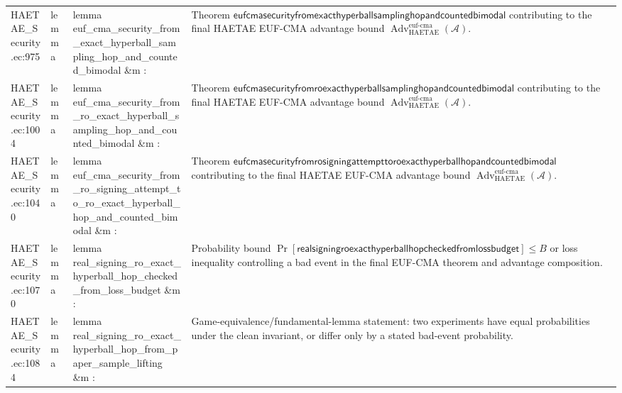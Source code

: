 \documentclass[10pt]{article}
\newcommand{\Adv}{\operatorname{Adv}}
\begin{document}
\begin{longtable}{L{0.11\textwidth}L{0.055\textwidth}L{0.385\textwidth}L{0.41\textwidth}}
HAETAE\_\allowbreak{}Security.\allowbreak{}ec:\allowbreak{}975 & lemma & {\ttfamily\scriptsize lemma euf\_\allowbreak{}cma\_\allowbreak{}security\_\allowbreak{}from\_\allowbreak{}exact\_\allowbreak{}hyperball\_\allowbreak{}sampling\_\allowbreak{}hop\_\allowbreak{}and\_\allowbreak{}counted\_\allowbreak{}bimodal \&m :} & Theorem $\mathsf{eufcmasecurityfromexacthyperballsamplinghopandcountedbimodal}$ contributing to the final HAETAE EUF-CMA advantage bound $\Adv_{\mathrm{HAETAE}}^{\mathrm{euf\mbox{-}cma}}(\mathcal A)$. \\
HAETAE\_\allowbreak{}Security.\allowbreak{}ec:\allowbreak{}1004 & lemma & {\ttfamily\scriptsize lemma euf\_\allowbreak{}cma\_\allowbreak{}security\_\allowbreak{}from\_\allowbreak{}ro\_\allowbreak{}exact\_\allowbreak{}hyperball\_\allowbreak{}sampling\_\allowbreak{}hop\_\allowbreak{}and\_\allowbreak{}counted\_\allowbreak{}bimodal \&m :} & Theorem $\mathsf{eufcmasecurityfromroexacthyperballsamplinghopandcountedbimodal}$ contributing to the final HAETAE EUF-CMA advantage bound $\Adv_{\mathrm{HAETAE}}^{\mathrm{euf\mbox{-}cma}}(\mathcal A)$. \\
HAETAE\_\allowbreak{}Security.\allowbreak{}ec:\allowbreak{}1040 & lemma & {\ttfamily\scriptsize lemma euf\_\allowbreak{}cma\_\allowbreak{}security\_\allowbreak{}from\_\allowbreak{}ro\_\allowbreak{}signing\_\allowbreak{}attempt\_\allowbreak{}to\_\allowbreak{}ro\_\allowbreak{}exact\_\allowbreak{}hyperball\_\allowbreak{}hop\_\allowbreak{}and\_\allowbreak{}counted\_\allowbreak{}bimodal \&m :} & Theorem $\mathsf{eufcmasecurityfromrosigningattempttoroexacthyperballhopandcountedbimodal}$ contributing to the final HAETAE EUF-CMA advantage bound $\Adv_{\mathrm{HAETAE}}^{\mathrm{euf\mbox{-}cma}}(\mathcal A)$. \\
HAETAE\_\allowbreak{}Security.\allowbreak{}ec:\allowbreak{}1070 & lemma & {\ttfamily\scriptsize lemma real\_\allowbreak{}signing\_\allowbreak{}ro\_\allowbreak{}exact\_\allowbreak{}hyperball\_\allowbreak{}hop\_\allowbreak{}checked\_\allowbreak{}from\_\allowbreak{}loss\_\allowbreak{}budget \&m :} & Probability bound $\Pr[\mathsf{realsigningroexacthyperballhopcheckedfromlossbudget}]\le B$ or loss inequality controlling a bad event in the final EUF-CMA theorem and advantage composition. \\
HAETAE\_\allowbreak{}Security.\allowbreak{}ec:\allowbreak{}1084 & lemma & {\ttfamily\scriptsize lemma real\_\allowbreak{}signing\_\allowbreak{}ro\_\allowbreak{}exact\_\allowbreak{}hyperball\_\allowbreak{}hop\_\allowbreak{}from\_\allowbreak{}paper\_\allowbreak{}sample\_\allowbreak{}lifting \&m :} & Game-equivalence/fundamental-lemma statement: two experiments have equal probabilities under the clean invariant, or differ only by a stated bad-event probability. \\

\end{longtable}
\end{document}
